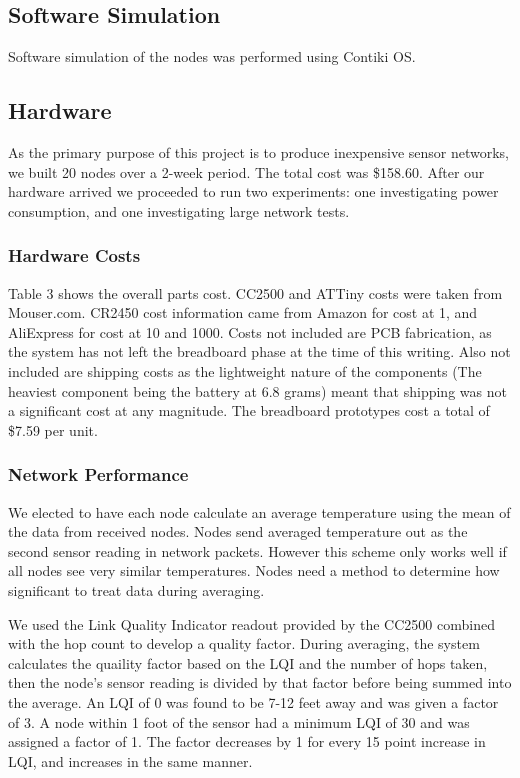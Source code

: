 \subsection{Software Simulation}

Software simulation of the nodes was performed using Contiki OS. 

\subsection{Hardware}

As the primary purpose of this project is to produce inexpensive sensor networks, we built 20 nodes over a 2-week period. The total cost was \$158.60. After our hardware arrived we proceeded to run two experiments: one investigating power consumption, and one investigating large network tests.

\subsubsection{Hardware Costs}

Table 3 shows the overall parts cost. CC2500 and ATTiny costs were taken from Mouser.com. CR2450 cost information came from Amazon for cost at 1, and AliExpress for cost at 10 and 1000. Costs not included are PCB fabrication, as the system has not left the breadboard phase at the time of this writing. Also not included are shipping costs as the lightweight nature of the components (The heaviest component being the battery at 6.8 grams) meant that shipping was not a significant cost at any magnitude. The breadboard prototypes cost a total of \$7.59 per unit.

\subsubsection{Network Performance} 
We elected to have each node calculate an average temperature using the mean of the data from received nodes. Nodes send averaged temperature out as the second sensor reading in network packets. However this scheme only works well if all nodes see very similar temperatures. Nodes need a method to determine how significant to treat data during averaging.

We used the Link Quality Indicator readout provided by the CC2500 combined with the hop count to develop a quality factor. During averaging, the system calculates the quaility factor based on the LQI and the number of hops taken, then the node's sensor reading is divided by that factor before being summed into the average. An LQI of 0 was found to be 7-12 feet away and was given a factor of 3. A node within 1 foot of the sensor had a minimum LQI of 30 and was assigned a factor of 1. The factor decreases by 1 for every 15 point increase in LQI, and increases in the same manner.

